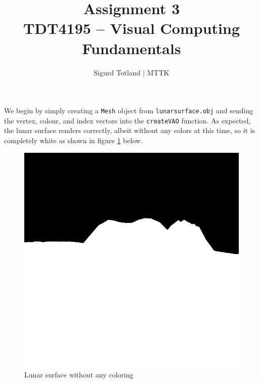 \documentclass[]{article}
\title{\Huge{Assignment 3} \\ \Large{TDT4195 – Visual Computing Fundamentals}}
\author{Sigurd Totland | MTTK}
\begin{document}
\maketitle
\begin{multicols}{2}
\section{}
\subsection{}
We begin by simply creating a \texttt{Mesh} object from \texttt{lunarsurface.obj} and sending the vertex, colour, and index vectors into the \texttt{createVAO} function. As expected, the lunar surface renders correctly, albeit without any colors at this time, so it is completely white as shown in figure \ref{fig:white-surface} below.
\begin{figure}[H]
\centering
\includegraphics[width=0.5\columnwidth]{white-surface}
\caption{Lunar surface without any coloring}
\label{fig:white-surface}
\end{figure}

\setcounter{subsection}{2}

\end{multicols}
\end{document}
